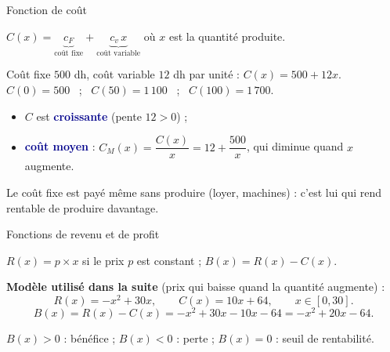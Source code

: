 \documentclass[aspectratio=169,11pt]{beamer}
\newcommand{\key}[1]{\textcolor{DarkBlue}{\textbf{#1}}}
\begin{document}
\begin{frame}{Fonction de coût}
	\begin{definitionbox}
		$C(x)=\underbrace{c_F}_{\text{coût fixe}}+\underbrace{c_v\,x}_{\text{coût variable}}$ où $x$ est la quantité produite.
	\end{definitionbox}
	\begin{exemplebox}
		Coût fixe $500$ dh, coût variable $12$ dh par unité : $C(x)=500+12x$.\\
		$C(0)=500$ \ ; \ $C(50)=1\,100$ \ ; \ $C(100)=1\,700$.
	\end{exemplebox}
	\begin{itemize}
		\item $C$ est \key{croissante} (pente $12>0$) ;
		\item \key{coût moyen} : $C_M(x)=\dfrac{C(x)}{x}=12+\dfrac{500}{x}$, qui diminue quand $x$ augmente.
	\end{itemize}
	\begin{applicationbox}\small
		Le coût fixe est payé même sans produire (loyer, machines) : c'est lui qui rend rentable de produire davantage.
	\end{applicationbox}
\end{frame}

\begin{frame}{Fonctions de revenu et de profit}
	\begin{definitionbox}
		$R(x)=p\times x$ si le prix $p$ est constant ; $B(x)=R(x)-C(x)$.
	\end{definitionbox}
	\vspace{2pt}
	\textbf{Modèle utilisé dans la suite} (prix qui baisse quand la quantité augmente) :
	\[ R(x)=-x^2+30x,\qquad C(x)=10x+64,\qquad x\in[0,30]. \]
	\[ B(x)=R(x)-C(x)=-x^2+30x-10x-64=-x^2+20x-64. \]
	\begin{attentionbox}[Lecture]\small
		$B(x)>0$ : bénéfice ; $B(x)<0$ : perte ; $B(x)=0$ : seuil de rentabilité.
	\end{attentionbox}
\end{frame}
\end{document}
